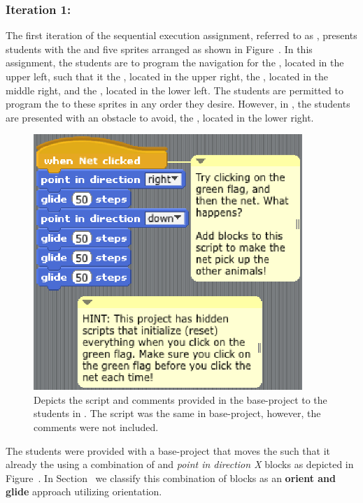 \subsubsection{Iteration 1: \sone{}} 
The first iteration of the sequential execution assignment, referred to as
\sone{}, presents students with the \stage{} and five sprites arranged as shown
in Figure~. In this assignment, the students are to
program the navigation for the \net{}, located in the upper left, such that it
 the \bear{}, located in the upper right, the \horse{}, located in
the middle right, and the \zebra{}, located in the lower left. The students are
permitted to program the \net{} to \catch{} these sprites in any order they
desire. However, in \sone{}, the students are presented with an obstacle to
avoid, the \snake{}, located in the lower right.

\begin{figure}[!t]
\centering
\includegraphics[width=4.0in]{graphs/screen_blocks.eps}
\caption{Depicts the script and comments provided in the base-project to the
  students in \stwo{}. The script was the same in  base-project,
  however, the comments were not included.}
\end{figure}

The students were provided with a base-project that moves the \net{} such that
it already  the \zebra{} using a combination of \glideDIST{} and
\emph{point in direction X} blocks as depicted in
Figure~. In Section~ we
classify this combination of blocks as an \textbf{orient and glide} approach
utilizing \abs{} orientation.

